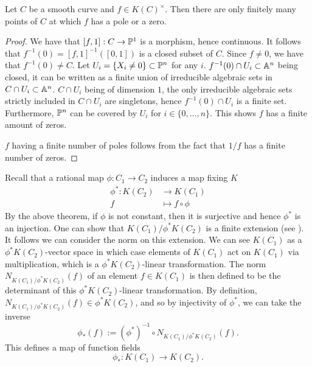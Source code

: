 \begin{proposition}
	\label{prop:zero-finiteness}
	Let $C$ be a smooth curve and $f \in K(C)^\times$.
	Then there are only finitely 
	many points of $C$ at which $f$ has a pole or a zero.
\end{proposition}

\begin{proof}
	We have that $[f, 1]: C \to \mathbb{P}^1$ is a morphism, hence continuous.
	It follows that $f^{-1}(0) = [f, 1]^{-1}([0, 1])$ is a closed subset
	of $C$. Since $f \neq 0$, we have that $f^{-1}(0) \neq C$.
	Let $U_i = \{X_i \neq 0\} \subset \mathbb{P}^n$ for any $i$.
	$f^{-1}(0)\cap U_i \subset \mathbb{A}^n$ being closed,
	it can be written as a finite union of irreducible
	algebraic sets in $C\cap U_i \subset \mathbb{A}^n$.
	$C\cap U_i$ being of dimension $1$, the only irreducible algebraic
	sets strictly included in $C \cap U_i$ are singletons,
	hence $f^{-1}(0)\cap U_i$ is a finite set.
	Furthermore, $\mathbb{P}^n$ can be covered by $U_i$ for $i \in \{0, \dots, n\}$.
	This shows $f$ has a finite amount of zeros.

	$f$ having a finite number of poles follows from the
	fact that $1/f$ has a finite number of zeros.
\end{proof}


Recall that a rational map $\phi: C_1 \to C_2$ induces a map fixing $K$
\begin{align*}
	\phi^*: K(C_2) &\to K(C_1)\\
	f &\mapsto f\circ\phi
\end{align*}
By the above theorem, if $\phi$ is not constant, then it is surjective
and hence $\phi^*$ is an injection.
One can show that $K(C_1) / \phi^*K(C_2)$ is a finite extension 
(see \cite[II.6.8]{hartshorne}).
It follows we can consider the norm on this extension. We can see $K(C_1)$ as a
$\phi^*K(C_2)$-vector space in which case elements of $K(C_1)$ act on
$K(C_1)$ via multiplication, which is a $\phi^*K(C_2)$-linear
transformation. The norm $N_{K(C_1)/\phi^*K(C_2)}(f)$ of an element
$f \in K(C_1)$ is then defined to be
the determinant of this $\phi^*K(C_2)$-linear transformation.
By definition, $N_{K(C_1)/\phi^*K(C_2)}(f) \in \phi^*K(C_2)$, and so by
injectivity of $\phi^*$, we can take the inverse
\begin{equation*}
	\phi_*(f) := (\phi^*)^{-1}\circ N_{K(C_1)/\phi^* K(C_2)}(f).
\end{equation*}
This defines a map of function fields 
\begin{equation*}
	\phi_*: K(C_1) \to K(C_2).
\end{equation*}


